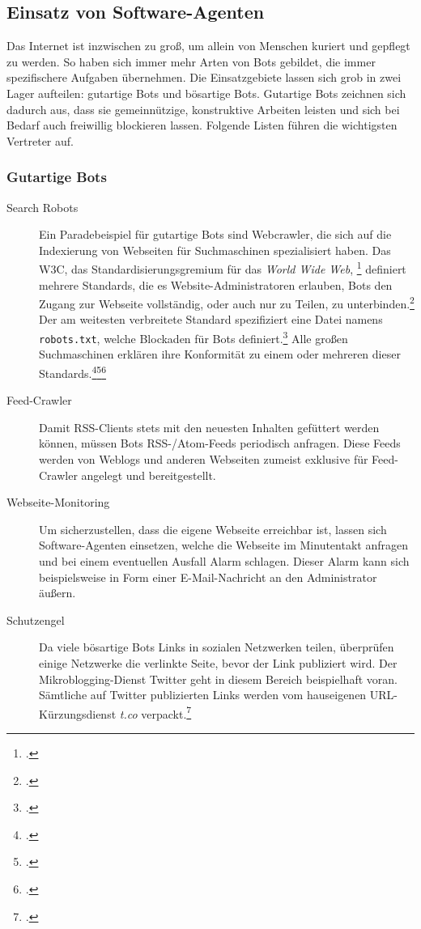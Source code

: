 \subsection{Einsatz von Software-Agenten}
\label{sub:einsatz-von-software-agenten}

Das Internet ist inzwischen zu groß, um allein von Menschen kuriert und
gepflegt zu werden. So haben sich immer mehr Arten von Bots gebildet, die immer
spezifischere Aufgaben übernehmen. Die Einsatzgebiete lassen sich grob in zwei
Lager aufteilen: gutartige Bots und bösartige Bots. Gutartige Bots zeichnen
sich dadurch aus, dass sie gemeinnützige, konstruktive Arbeiten leisten und
sich bei Bedarf auch freiwillig blockieren lassen. Folgende Listen führen die
wichtigsten Vertreter auf.

\subsubsection{Gutartige Bots}
\label{ssub:gutartige-bots}

\begin{description}
  \item[Search Robots]
  Ein Paradebeispiel für gutartige Bots sind Webcrawler, die sich auf die
  Indexierung von Webseiten für Suchmaschinen spezialisiert haben. Das W3C, das
  Standardisierungsgremium für das \emph{World Wide Web},
  \footcite{w3c:standards} definiert mehrere Standards, die es
  Website-Administratoren erlauben, Bots den Zugang zur Webseite vollständig,
  oder auch nur zu Teilen, zu unterbinden.\footcite{w3c:searchBots}
  \label{robotstxt} Der am weitesten verbreitete Standard spezifiziert eine
  Datei namens \texttt{robots.txt}, welche Blockaden für Bots
  definiert.\footcite{w3c:robotsTxt} Alle großen Suchmaschinen erklären ihre
  Konformität zu einem oder mehreren dieser
  Standards.\footcite{robotsTagGoogle}\footcite{yandexUsingRobotsTxt}\footcite{duckduckgoBot}
  
  \item[Feed-Crawler]
  Damit RSS-Clients stets mit den neuesten Inhalten gefüttert werden können,
  müssen Bots RSS-/Atom-Feeds periodisch anfragen. Diese Feeds werden von
  Weblogs und anderen Webseiten zumeist exklusive für Feed-Crawler angelegt und
  bereitgestellt.
  
  \item[Webseite-Monitoring]
  Um sicherzustellen, dass die eigene Webseite erreichbar ist, lassen sich
  Software-Agenten einsetzen, welche die Webseite im Minutentakt anfragen und
  bei einem eventuellen Ausfall Alarm schlagen. Dieser Alarm kann sich
  beispielsweise in Form einer E-Mail-Nachricht an den Administrator äußern.
  
  \item[Schutzengel]
  Da viele bösartige Bots Links in sozialen Netzwerken teilen, überprüfen
  einige Netzwerke die verlinkte Seite, bevor der Link publiziert wird. Der
  Mikroblogging-Dienst Twitter geht in diesem Bereich beispielhaft voran.
  Sämtliche auf Twitter publizierten Links werden vom hauseigenen
  URL-Kürzungsdienst \emph{t.co} verpackt.\footcite{twitterShortLink}
\end{description}

